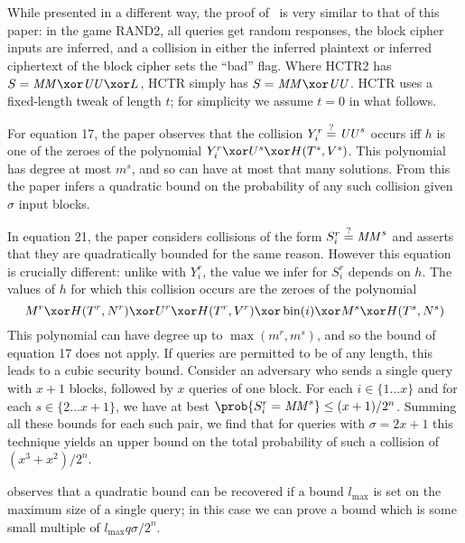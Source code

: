 \documentclass[hctr.tex]{subfiles}
\begin{document}
While presented in a different way, 
the proof of~\cite{hctrquad} is very similar
to that of this paper: in the game RAND2, all queries get random
responses, the block cipher inputs are inferred, and a collision
in either the inferred plaintext or inferred ciphertext of the block cipher
sets the ``bad'' flag.  Where HCTR2 has
\(S = \MM \xor \UU \xor L\), HCTR simply has
\(S = \MM \xor \UU\). HCTR uses a fixed-length tweak
of length \(t\); for simplicity we assume \(t = 0\)
in what follows.

For equation 17, the paper observes that the collision
\(Y_i^r \stackrel{\text{?}}{=} \mathit{UU}^s\) occurs iff \(h\) is one of the zeroes
of the polynomial \(Y_i^r \xor U^s \xor H(T^s, V^s)\).
This polynomial has degree at most
\(m^s\), and so can have
at most that many solutions. From this the paper infers
a quadratic bound on the probability of any such collision
given \(\sigma\) input blocks.

In equation 21, the paper considers collisions of the form 
\(S_i^r \stackrel{\text{?}}{=} \mathit{MM}^s\) and asserts that they are
quadratically bounded for the same reason. However this equation
is crucially different: unlike with \(Y_i^r\), the value we
infer for \(S_i^r\) depends on \(h\). The values of \(h\)
for which this collision occurs are
the zeroes of the polynomial
\begin{displaymath}
    M^r \xor H(T^r, N^r)
    \xor U^r \xor H(T^r, V^r) \xor \fromint(i) 
    \xor M^s \xor H(T^s, N^s)        
\end{displaymath}
This polynomial can have degree up to 
\(\max(m^r, m^s)\), and so the bound of
equation 17 does not apply.
If queries are permitted to be of any length,
this leads to a cubic security bound.
Consider an adversary who
sends a single query with \(x+1\) blocks, followed by
\(x\) queries of one block. For each \(i \in \{1\ldots x\}\) and
for each \(s \in \{2 \ldots x + 1\}\), we have at best
\(\prob{S_i^r = \MM^s} \leq (x + 1)/2^n\). Summing
all these bounds for each such pair, we find that
for queries with \(\sigma = 2x + 1\)
this technique yields an upper bound on 
the total probability of such a collision of
\((x^3 + x^2)/2^n\).

\cite{nandimail} observes that a quadratic bound can be recovered
if a bound \(l_\mathrm{max}\) is set on the maximum size of
a single query; in this case we can prove a bound
which is some small multiple of \(l_\mathrm{max}q\sigma/2^n\).
\end{document}
